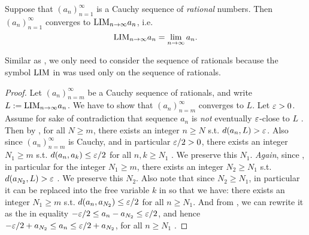 \begin{proposition}  \label{prop 6.1.15}
Suppose that \((a_n)_{n = 1}^{\infty}\) is a Cauchy sequence of \emph{rational} numbers.
Then \((a_n)_{n = 1}^{\infty}\) converges to \(\text{LIM}_{n \to \infty} a_n\),
i.e.
\[
    \text{LIM}_{n \to \infty} a_n = \lim_{n \to \infty} a_n.
\]
\end{proposition}

\begin{note}
Similar as , we only need to consider the sequence of rationals because the symbol \(\text{LIM}\) in  was used only on the sequence of rationals.
\end{note}

\begin{proof}
Let \((a_n)_{n = m}^{\infty}\) be a Cauchy sequence of rationals, and write \(L := \text{LIM}_{n \to \infty} a_n\).
We have to show that \((a_n)_{n = m}^{\infty}\) converges to \(L\).
Let \(\varepsilon > 0\).
Assume for sake of contradiction that sequence \(a_n\) is \emph{not} eventually \(\varepsilon\)-close to \(L\) \MAROON{(*)}.
Then by , for all \(N \ge m\), there exists an integer \(n \ge N\) s.t. \(d(a_n, L) > \varepsilon\).
Also since \((a_n)_{n = m}^{\infty}\) is Cauchy, and in particular \(\varepsilon/2 > 0\), there exists an integer \(N_1 \ge m\) s.t. \(d(a_n, a_k) \le \varepsilon/2\) for all \(n, k \ge N_1\) \MAROON{(**)}.
We preserve this \(N_1\).
\emph{Again}, since \MAROON{(*)}, in particular for the integer \(N_1 \ge m\), there exists an integer \(N_2 \ge N_1\) s.t. \(d(a_{N_2}, L) > \varepsilon\) \MAROON{(***)}.
We preserve this \(N_2\).
Also note that since \(N_2 \ge N_1\), in particular it can be replaced into the free variable \(k\) in \MAROON{(**)} so that we have:
there exists an integer \(N_1 \ge m\) s.t. \(d(a_n, a_{N_2}) \le \varepsilon/2\) for all \(n \ge N_1\).
And from , we can rewrite it as the in equality \(-\varepsilon/2 \le a_n - a_{N_2} \le \varepsilon/2\), and hence \(-\varepsilon/2 + a_{N_2} \le a_n \le \varepsilon/2 + a_{N_2}\), for all \(n \ge N_1\) \BLUE{(*)}.


\end{proof}
